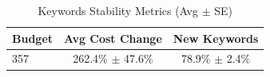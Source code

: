 \begin{table}[htbp]
\centering
\caption{Keywords Stability Metrics (Avg $\pm$ SE)}
\begin{tabular}{lcc}
\toprule
Budget & Avg Cost Change & New Keywords \\
\midrule
357 & 262.4\% $\pm$ 47.6\% & 78.9\% $\pm$ 2.4\% \\
\bottomrule
\end{tabular}
\end{table}